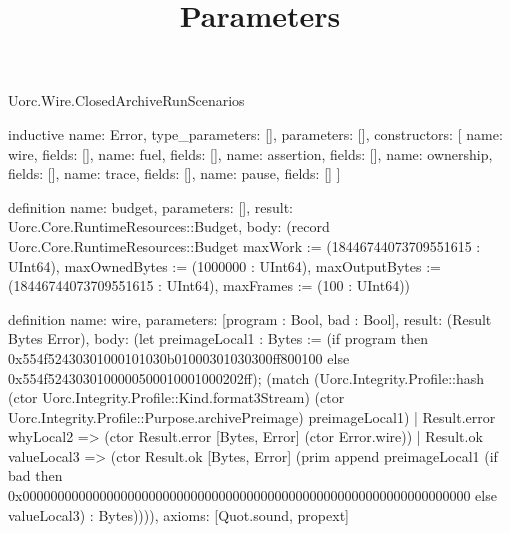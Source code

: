 \begin{lexlean}{Uorc.Wire.ClosedArchiveRunScenarios}
\title{Parameters}
\begin{semanticmodule}
inductive{
  name: Error,
  type_parameters: [],
  parameters: [],
  constructors: [
    {name: wire, fields: []},
    {name: fuel, fields: []},
    {name: assertion, fields: []},
    {name: ownership, fields: []},
    {name: trace, fields: []},
    {name: pause, fields: []}
  ]
}

definition{
  name: budget,
  parameters: [],
  result: Uorc.Core.RuntimeResources::Budget,
  body: (record Uorc.Core.RuntimeResources::Budget {maxWork := (18446744073709551615 : UInt64), maxOwnedBytes := (1000000 : UInt64), maxOutputBytes := (18446744073709551615 : UInt64), maxFrames := (100 : UInt64)})
}

definition{
  name: wire,
  parameters: [program : Bool, bad : Bool],
  result: (Result Bytes Error),
  body: (let preimageLocal1 : Bytes := (if program then 0x554f52430301000101030b01000301030300ff800100 else 0x554f5243030100000500010001000202ff); (match (Uorc.Integrity.Profile::hash (ctor Uorc.Integrity.Profile::Kind.format3Stream) (ctor Uorc.Integrity.Profile::Purpose.archivePreimage) preimageLocal1)
    | Result.error whyLocal2 => (ctor Result.error [Bytes, Error] (ctor Error.wire))
    | Result.ok valueLocal3 => (ctor Result.ok [Bytes, Error] (prim append preimageLocal1 (if bad then 0x0000000000000000000000000000000000000000000000000000000000000000 else valueLocal3) : Bytes)))),
  axioms: [Quot.sound, propext]
}


\end{semanticmodule}
\end{lexlean}
